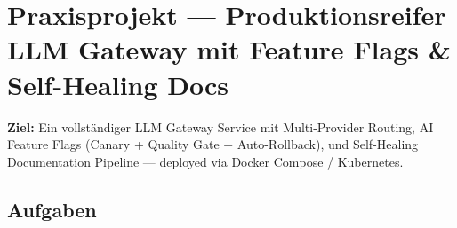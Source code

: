 \section{Praxisprojekt — Produktionsreifer LLM Gateway mit Feature Flags \& Self-Healing Docs}

\textbf{Ziel:} Ein vollständiger LLM Gateway Service mit Multi-Provider Routing, AI Feature Flags (Canary + Quality Gate + Auto-Rollback), und Self-Healing Documentation Pipeline — deployed via Docker Compose / Kubernetes.

\subsection*{Aufgaben}

